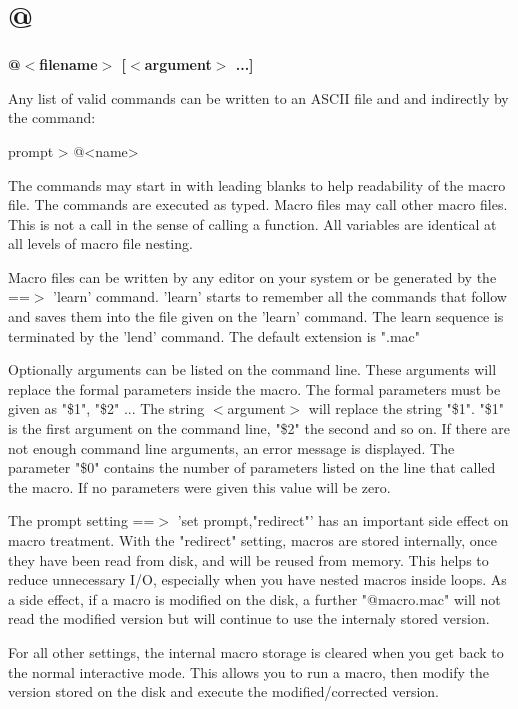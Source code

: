 \section{@}
{\bf @$ <$filename$> $ [$ <$argument$> $ ...] \par }
\par
\vspace{3pt}
Any list of valid commands can be written to an ASCII file and 
and indirectly by the command: 
\par
\begin{MacVerbatim}
prompt > @<name>
\end{MacVerbatim}
The commands may start in with leading blanks to help readability of 
the macro file. The commands are executed as typed. 
Macro files may call other macro files. This is not a call in 
the sense of calling a function. 
All variables are identical at all levels of macro file nesting. 
\par
Macro files can be written by any editor on your 
system or be generated by the ==$> $ 'learn' command. 'learn' starts to 
remember all the commands that follow and saves them into the file 
given on the 'learn' command. The learn sequence is terminated by 
the 'lend' command. The default extension is ".mac" 
\par
Optionally arguments can be listed on the command line. These arguments 
will replace the formal parameters inside the macro. The formal 
parameters must be given as "\$1", "\$2" ... The string $ <$argument$> $ will 
replace the string "\$1". "\$1" is the first argument on the command line, 
"\$2" the second and so on. If there are not enough command line arguments, 
an error message is displayed. 
The parameter "\$0" contains the number of parameters listed on the line 
that called the macro. If no parameters were given this value will be 
zero. 
\par
The prompt setting ==$> $ 'set prompt,"redirect"' has an important side 
effect on macro treatment. 
With the "redirect" setting, macros are stored internally, 
once they have been read from disk, and will be reused from memory. This 
helps to reduce unnecessary I/O, especially when you have nested macros 
inside loops. As a side effect, if a macro is modified on the disk, 
a further "@macro.mac" will not read the modified version but will 
continue to use the internaly stored version. 
\par
For all other settings, the internal macro storage is 
cleared when you get back to the normal interactive mode. This allows 
you to run a macro, then modify the version stored on the disk and 
execute the modified/corrected version. 
